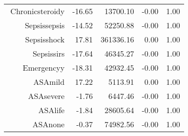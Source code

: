 \begin{tabular}{rrrrr}
$$  Chronic\-steroid\-y & -16.65 & 13700.10 & -0.00 & 1.00 \\ 
  Sepsis\-sepsis & -14.52 & 52250.88 & -0.00 & 1.00 \\ 
  Sepsis\-shock & 17.81 & 361336.16 & 0.00 & 1.00 \\ 
  Sepsis\-sirs & -17.64 & 46345.27 & -0.00 & 1.00 \\ 
  Emergency\-y & -18.31 & 42932.45 & -0.00 & 1.00 \\ 
  ASA\-mild & 17.22 & 5113.91 & 0.00 & 1.00 \\ 
  ASA\-severe & -1.76 & 6447.46 & -0.00 & 1.00 \\ 
  ASA\-life & -1.84 & 28605.64 & -0.00 & 1.00 \\ 
  ASA\-none & -0.37 & 74982.56 & -0.00 & 1.00 \\ 
   \hline
\end{tabular}

